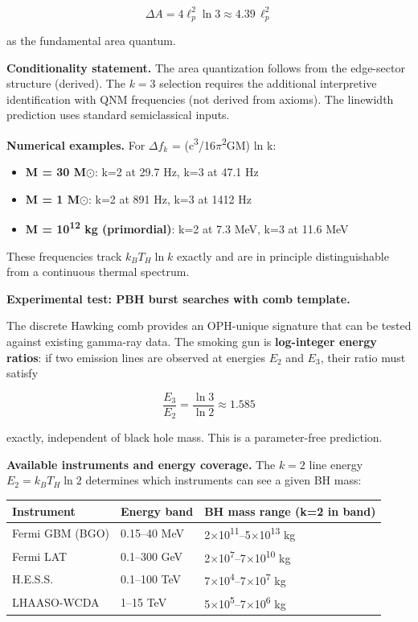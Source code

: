 \documentclass[11pt,a4paper]{article}
\theoremstyle{remark}
\providecommand{\tightlist}{%
  \setlength{\itemsep}{0pt}\setlength{\parskip}{0pt}}
\begin{document}
\[
\Delta A = 4\ell_p^2 \ln 3 \approx 4.39 \, \ell_p^2
\]

as the fundamental area quantum.

\textbf{Conditionality statement.} The area quantization follows from the
edge-sector structure (derived). The \(k = 3\) selection requires the
additional interpretive identification with QNM frequencies (not derived
from axioms). The linewidth prediction uses standard semiclassical inputs.

\textbf{Numerical examples.} For \(\ensuremath{\Delta}f_k\) = (c\textsuperscript{3}/16\ensuremath{\pi}\textsuperscript{2}GM) ln k:

\begin{itemize}
\tightlist
\item
  \textbf{M = 30 M\ensuremath{\odot}}: k=2 at 29.7 Hz, k=3 at 47.1 Hz
\item
  \textbf{M = 1 M\ensuremath{\odot}}: k=2 at 891 Hz, k=3 at 1412 Hz
\item
  \textbf{M = 10\textsuperscript{12} kg (primordial)}: k=2 at 7.3 MeV, k=3 at 11.6 MeV
\end{itemize}

These frequencies track \(k_B T_H \ln k\) exactly and are in principle
distinguishable from a continuous thermal spectrum.

\textbf{Experimental test: PBH burst searches with comb template.}

The discrete Hawking comb provides an OPH-unique signature that can be tested
against existing gamma-ray data. The smoking gun is \textbf{log-integer energy
ratios}: if two emission lines are observed at energies \(E_2\) and \(E_3\),
their ratio must satisfy

\[
\frac{E_3}{E_2} = \frac{\ln 3}{\ln 2} \approx 1.585
\]

exactly, independent of black hole mass. This is a parameter-free prediction.

\textbf{Available instruments and energy coverage.} The \(k = 2\) line energy
\(E_2 = k_B T_H \ln 2\) determines which instruments can see a given BH mass:

{\def\LTcaptype{none} %
\begin{longtable}[]{@{}lll@{}}
\toprule\noalign{}
Instrument & Energy band & BH mass range (k=2 in band) \\
\midrule\noalign{}
\endhead
\bottomrule\noalign{}
\endlastfoot
Fermi GBM (BGO) & 0.15--40 MeV & 2\ensuremath{\times}10\textsuperscript{11}--5\ensuremath{\times}10\textsuperscript{13} kg \\
Fermi LAT & 0.1--300 GeV & 2\ensuremath{\times}10\textsuperscript{7}--7\ensuremath{\times}10\textsuperscript{10} kg \\
H.E.S.S. & 0.1--100 TeV & 7\ensuremath{\times}10\textsuperscript{4}--7\ensuremath{\times}10\textsuperscript{7} kg \\
LHAASO-WCDA & 1--15 TeV & 5\ensuremath{\times}10\textsuperscript{5}--7\ensuremath{\times}10\textsuperscript{6} kg \\
\end{longtable}
}
\end{document}
